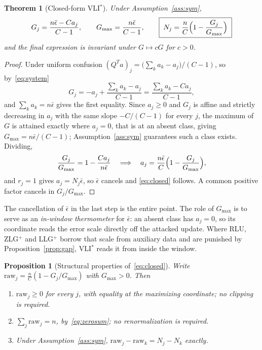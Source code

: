 \documentclass[11pt]{article}
\newtheorem{theorem}{Theorem}
\newtheorem{proposition}{Proposition}
\theoremstyle{remark}
\begin{document}
\begin{theorem}[Closed-form VLI$^*$]
\label{thm:closed}
Under Assumption~\ref{ass:sym},
\begin{equation}
 G_j = \frac{n\bar\epsilon - C a_j}{C-1},
 \qquad
 G_{\max} = \frac{n\bar\epsilon}{C-1},
 \qquad
 \boxed{\;N_j = \frac{n}{C}\Bigl(1 - \frac{G_j}{G_{\max}}\Bigr)\;}
 \label{eq:closed}
\end{equation}
and the final expression is invariant under $G \mapsto cG$ for $c>0$.
\end{theorem}

\begin{proof}
Under uniform confusion
$(Q^Ta)_j = \bigl(\sum_k a_k - a_j\bigr)/(C-1)$, so
by~\eqref{eq:system}
\[
 G_j = -a_j + \frac{\sum_k a_k - a_j}{C-1}
     = \frac{\sum_k a_k - C a_j}{C-1} ,
\]
and $\sum_k a_k = n\bar\epsilon$ gives the first equality. Since
$a_j \ge 0$ and $G_j$ is affine and strictly decreasing in $a_j$ with the
same slope $-C/(C-1)$ for every $j$, the maximum of $G$ is attained exactly
where $a_j = 0$, that is at an absent class, giving
$G_{\max} = n\bar\epsilon/(C-1)$; Assumption~\ref{ass:sym} guarantees such a
class exists. Dividing,
\[
 \frac{G_j}{G_{\max}} = 1 - \frac{C a_j}{n\bar\epsilon}
 \quad\Longrightarrow\quad
 a_j = \frac{n\bar\epsilon}{C}\Bigl(1 - \frac{G_j}{G_{\max}}\Bigr),
\]
and $r_j = 1$ gives $a_j = N_j\bar\epsilon$, so $\bar\epsilon$ cancels and
\eqref{eq:closed} follows. A common positive factor cancels in
$G_j/G_{\max}$.
\end{proof}

The cancellation of $\bar\epsilon$ in the last step is the entire point. The
role of $G_{\max}$ is to serve as an \emph{in-window thermometer} for
$\bar\epsilon$: an absent class has $a_j = 0$, so its coordinate reads the
error scale directly off the attacked update. Where RLU, ZLG$^+$ and LLG$^+$
borrow that scale from auxiliary data and are punished by
Proposition~\ref{prop:gap}, VLI$^*$ reads it from inside the window.

\begin{proposition}[Structural properties of~\eqref{eq:closed}]
\label{prop:props}
Write $\mathrm{raw}_j = \tfrac{n}{C}(1 - G_j/G_{\max})$ with $G_{\max}>0$.
Then
\begin{enumerate}
\item $\mathrm{raw}_j \ge 0$ for every $j$, with equality at the maximizing
  coordinate; no clipping is required.
\item $\sum_j \mathrm{raw}_j = n$, by~\eqref{eq:zerosum}; no renormalization
  is required.
\item Under Assumption~\ref{ass:sym},
  $\mathrm{raw}_j - \mathrm{raw}_k = N_j - N_k$ exactly.
\end{enumerate}
\end{proposition}
\end{document}
